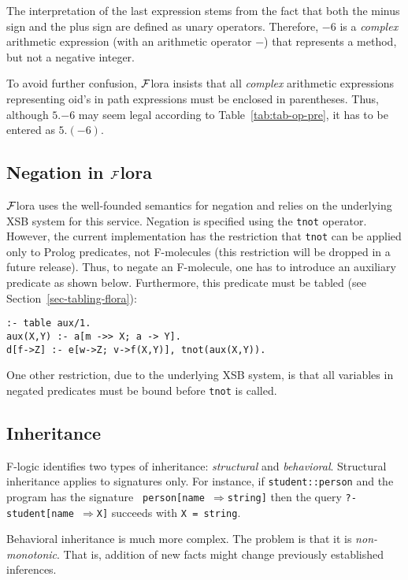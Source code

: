 \documentclass[11pt]{article}
\newcommand{\Fd}{\ensuremath{{\Rightarrow}}}                      %
\newcommand{\FLORA}{{\mbox{${\cal F}${\sc lora}}}\xspace}
\newcommand{\fl}{{F-logic}\xspace}
\begin{document}
\noindent
The interpretation of the last expression stems from the fact that both the
minus sign and the plus sign are defined as unary operators. Therefore,
$-6$ is a \emph{complex} arithmetic expression (with an arithmetic operator
$-$) that represents a method, but not a negative integer.

To avoid further confusion, \FLORA insists that all \emph{complex}
arithmetic expressions representing oid's in path expressions must be
enclosed in parentheses. Thus, although $5.$$-6$ may seem legal according
to Table~\ref{tab:tab-op-pre}, it has to be entered as $5.(-6)$.

\subsection{Negation in \FLORA}

\FLORA uses the well-founded semantics for negation and relies on the
underlying XSB system for this service. Negation is specified using the
{\tt tnot} operator. However, the current implementation has the
restriction that {\tt tnot} can be applied only to Prolog predicates, not
F-molecules (this restriction will be dropped in a future release). Thus,
to negate an F-molecule, one has to introduce an auxiliary predicate as
shown below. Furthermore, this predicate must be tabled (see
Section~\ref{sec-tabling-flora}):
\begin{verbatim}
:- table aux/1.
aux(X,Y) :- a[m ->> X; a -> Y].
d[f->Z] :- e[w->Z; v->f(X,Y)], tnot(aux(X,Y)).
\end{verbatim}
One other restriction, due to the underlying XSB system, is that all
variables in negated predicates must be bound before {\tt tnot} is called.

\subsection{Inheritance}

\fl identifies two types of inheritance: \emph{structural} and
\emph{behavioral}.  Structural inheritance applies to signatures only. For
instance, if {\tt student::person} and the program has the signature {\tt
  person[name \Fd string]} then the query {\tt ?- student[name \Fd X]}
succeeds with {\tt X = string}.

Behavioral inheritance is much more complex. The problem  is that it is
\emph{non-monotonic}. That is, addition of new facts might change previously
established inferences.
\end{document}
